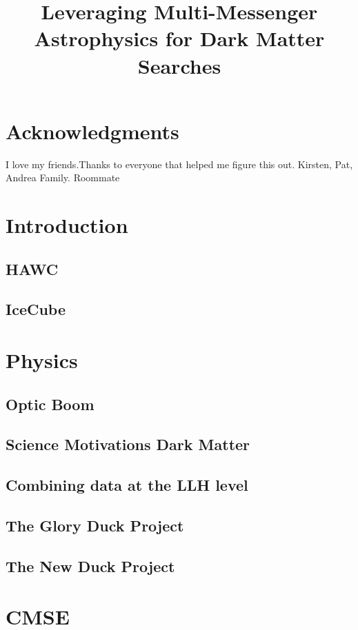 \documentclass[a4paper, 12pt]{article}
\begin{document}
\title{Leveraging Multi-Messenger Astrophysics for Dark Matter Searches}

\maketitle


\section{Acknowledgments}
I love my friends.Thanks to everyone that helped me figure this out.
Kirsten, Pat, Andrea
Family.
Roommate

\section{Introduction}
\subsection{HAWC}
\subsection{IceCube}

\section{Physics}
\subsection{Optic Boom}
\subsection{Science Motivations Dark Matter}
\subsection{Combining data at the LLH level}
\subsection{The Glory Duck Project}
\subsection{The New Duck Project}

\section{CMSE}
\end{document}
